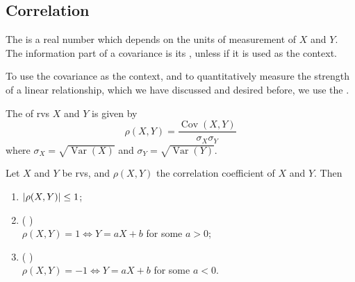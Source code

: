 \documentclass[notoc,notitlepage]{tufte-book}
\DeclareMathOperator{\Var}{Var }
\DeclareMathOperator{\Cov}{Cov }
\begin{document}

\subsection{Correlation}%
\label{sub:correlation}

The  is a real number which depends on the units of measurement of $X$ and $Y$. The information part of a covariance is its , unless if it is used as the context.

To use the covariance as the context, and to quantitatively measure the strength of a linear relationship, which we have discussed and desired before, we use the .

\begin{defn}
\label{defn:correlation_coefficient}
  The  of rvs $X$ and $Y$ is given by
  \begin{equation*}
    \rho(X, Y) = \frac{\Cov(X, Y)}{\sigma_X \sigma_Y}
  \end{equation*}
  where $\sigma_X = \sqrt{\Var(X)}$ and $\sigma_Y = \sqrt{\Var(Y)}$.
\end{defn}

\begin{propo}
\label{propo:properties_of_the_correlation_coefficient}
  Let $X$ and $Y$ be rvs, and $\rho(X, Y)$ the correlation coefficient of $X$ and $Y$. Then
  \begin{enumerate}
    \item $\left|\rho(X, Y)\right| \leq 1$;
    \item (   ) \\
      $\rho(X, Y) = 1 \iff Y = aX + b$ for some $a > 0$;
    \item (  ) \\
      $\rho(X, Y) = -1 \iff Y = aX + b$ for some $a < 0$.
  \end{enumerate}
\end{propo}
\end{document}
